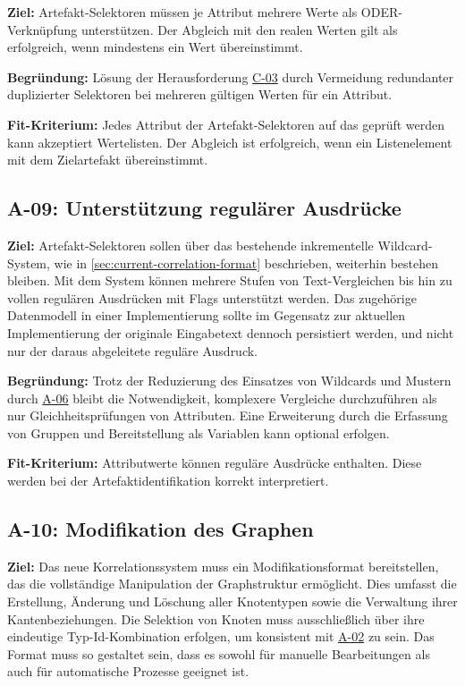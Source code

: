 \textbf{Ziel:}
Artefakt-Selektoren müssen je Attribut mehrere Werte als ODER-Verknüpfung unterstützen.
Der Abgleich mit den realen Werten gilt als erfolgreich, wenn mindestens ein Wert übereinstimmt.

\textbf{Begründung:}
Lösung der Herausforderung \hyperref[subsec:c-03-duplizierte-artefakt-selektoren]{C-03} durch Vermeidung redundanter duplizierter Selektoren bei mehreren gültigen Werten für ein Attribut.

\textbf{Fit-Kriterium:}
Jedes Attribut der Artefakt-Selektoren auf das geprüft werden kann akzeptiert Wertelisten.
Der Abgleich ist erfolgreich, wenn ein Listenelement mit dem Zielartefakt übereinstimmt.

\subsection{A-09: Unterstützung regulärer Ausdrücke}\label{subsec:req-regex-support}

\textbf{Ziel:}
Artefakt-Selektoren sollen über das bestehende inkrementelle Wildcard-System, wie in \autoref{sec:current-correlation-format} beschrieben, weiterhin bestehen bleiben.
Mit dem System können mehrere Stufen von Text-Vergleichen bis hin zu vollen regulären Ausdrücken mit Flags unterstützt werden.
Das zugehörige Datenmodell in einer Implementierung sollte im Gegensatz zur aktuellen Implementierung der originale Eingabetext dennoch persistiert werden, und nicht nur der daraus abgeleitete reguläre Ausdruck.

\textbf{Begründung:}
Trotz der Reduzierung des Einsatzes von Wildcards und Mustern durch \hyperref[subsec:req-type-specific-matching]{A-06} bleibt die Notwendigkeit, komplexere Vergleiche durchzuführen als nur Gleichheitsprüfungen von Attributen.
Eine Erweiterung durch die Erfassung von Gruppen und Bereitstellung als Variablen kann optional erfolgen.

\textbf{Fit-Kriterium:}
Attributwerte können reguläre Ausdrücke enthalten.
Diese werden bei der Artefaktidentifikation korrekt interpretiert.

\subsection{A-10: Modifikation des Graphen}\label{subsec:req-manual-format-modification}

\textbf{Ziel:}
Das neue Korrelationssystem muss ein Modifikationsformat bereitstellen, das die vollständige Manipulation der Graphstruktur ermöglicht.
Dies umfasst die Erstellung, Änderung und Löschung aller Knotentypen sowie die Verwaltung ihrer Kantenbeziehungen.
Die Selektion von Knoten muss ausschließlich über ihre eindeutige Typ-Id-Kombination erfolgen, um konsistent mit \hyperref[subsec:req-node-id-type]{A-02} zu sein.
Das Format muss so gestaltet sein, dass es sowohl für manuelle Bearbeitungen als auch für automatische Prozesse geeignet ist.

